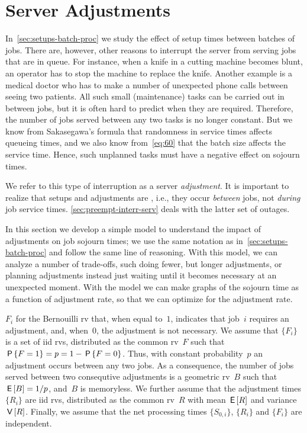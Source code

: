 \documentclass[queueing-book.tex]{subfiles}
\begin{document}
\section{Server Adjustments}
\label{sec:non-preempt-interr}


In~\cref{sec:setups-batch-proc} we study the effect of setup times between batches of jobs.
There are, however, other reasons to interrupt the server from serving jobs that are in queue.
For instance,  when a knife in a cutting machine becomes blunt, an operator has to stop the machine to replace the knife.
Another example is a medical doctor who  has to make a number of unexpected phone calls between seeing two patients.
All such small (maintenance) tasks can be carried out in between jobs, but it is often hard to predict when they are required.
Therefore, the number of jobs served between any two tasks
is no longer constant.
But we know from Sakasegawa's formula that randomness in service times affects queueing times, and we also know from~\cref{eq:60} that the batch size affects the service time.
Hence, such unplanned tasks must have a negative effect on sojourn times.

We refer to this type of interruption as a server \emph{adjustment}.
It is important to realize that setups and adjustments are , i.e., they occur \emph{between} jobs, not \emph{during} job service times. \cref{sec:preempt-interr-serv} deals with the latter set of outages.


In this section we develop a simple model to understand the impact of adjustments on job sojourn times; we use the same notation as in~\cref{sec:setups-batch-proc} and follow the same line of reasoning.
With this model, we can analyze a number of trade-offs, such doing fewer, but longer adjustments, or planning adjustments instead just waiting until it becomes necessary at an unexpected moment. With the model we can make graphs of the sojourn time as a function of adjustment rate, so that we can optimize for the adjustment rate.


 $F_{i}$ for the Bernouilli rv that, when equal to~$1$, indicates that job~$i$ requires an adjustment, and, when~$0$, the adjustment is not necessary.
We assume that $\{F_{i}\}$ is a set of iid rvs, distributed as the common rv~$F$ such that $\P{F=1} = p = 1-\P{F=0}$.
Thus, with constant probability~$p$ an adjustment occurs between any two jobs.
As a consequence, the number of jobs served between two consequtive adjustments is a geometric rv~$B$ such that $\E{B} = 1/p$, and~$B$ is memoryless.
We further assume that the adjustment times $\{R_{i}\}$ are iid rvs, distributed as the common rv~$R$ with mean $\E R$ and variance $\V R$.
Finally, we assume that the net processing times $\{S_{0,i}\}$, $\{R_{i}\}$ and $\{F_{i}\}$ are independent.
\end{document}
